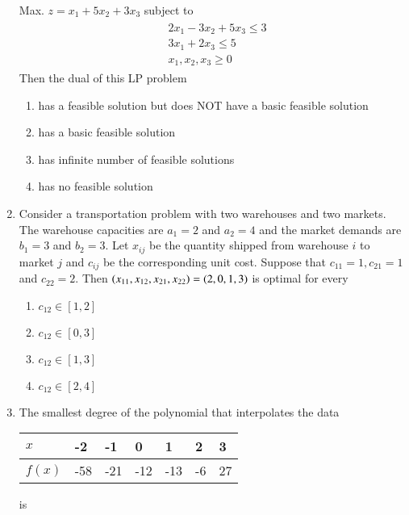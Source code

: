 \documentclass[journal]{IEEEtran}
\begin{document}
\begin{enumerate}
Max. $z=x_{1}+5 x_{2}+3 x_{3}$
subject to
             \begin{align*}
		\begin{aligned}
& 2 x_{1}-3 x_{2}+5 x_{3} \leq 3 \\
& 3 x_{1}+2 x_{3} \leq 5 \\
& x_{1}, x_{2}, x_{3} \geq 0
\end{aligned}
             \end{align*}
	 Then the dual of this LP problem
		\begin{enumerate}
			\item has a feasible solution but does NOT have a basic feasible solution
			\item has a basic feasible solution
			\item has infinite number of feasible solutions
			\item has no feasible solution
        	\end{enumerate}
	\item Consider a transportation problem with two warehouses and two markets. The warehouse capacities are $a_{1}=2$ and $a_{2}=4$ and the market demands are $b_{1}=3$ and $b_{2}=3$. Let $x_{i j}$ be the quantity shipped from warehouse $i$ to market $j$ and $c_{i j}$ be the corresponding unit cost. Suppose that $c_{11}=1, c_{21}=1$ and $c_{22}=2$. Then $\left(x_{11}, x_{12}, x_{21}, x_{22}\right)=(2,0,1,3)$ is optimal for every
		\begin{enumerate}
			\item $c_{12} \in[1,2]$
			\item $c_{12} \in[0,3]$
	         	\item $c_{12} \in[1,3]$
                 	\item $c_{12} \in[2,4]$
	\end{enumerate}	
    \item The smallest degree of the polynomial that interpolates the data
     \begin{tabular}{|l|l|l|l|l|l|l|}
     \hline$x$ & -2 & -1 & 0 & 1 & 2 & 3 \\
     \hline$f(x)$ & -58 & -21 & -12 & -13 & -6 & 27 \\
     \hline
\end{tabular}
is
      \begin{enumerate}
\end{enumerate}
\end{enumerate}
\end{document}

